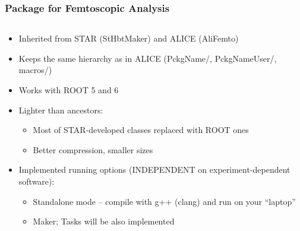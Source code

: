 \documentclass[dvipsnames] {beamer}
\begin{document}
      \begin{frame}
        \bf
        \frametitle{\bf \centering Package for Femtoscopic Analysis}
        \vskip -0.8cm
        \begin{columns}[t]
          \begin{block}{\bf {}}
            \begin{itemize}
            \item \scriptsize Inherited from STAR (StHbtMaker) and ALICE (AliFemto)
            \item \scriptsize Keeps the same hierarchy as in ALICE (PckgName/, PckgNameUser/, macros/)
            \item \scriptsize Works with ROOT 5 and 6
            \item  \scriptsize Lighter than ancestors:
              \begin{itemize}
              \item \scriptsize Most of STAR-developed classes replaced with ROOT ones
              \item \scriptsize Better compression, smaller sizes
              \end{itemize}
            \item \scriptsize Implemented running options (INDEPENDENT on experiment-dependent software):
              \begin{itemize}
              \item \scriptsize Standalone mode – compile with g++ (clang) and run on your “laptop”
              \item \scriptsize Maker; Tasks will be also implemented
              \end{itemize}
            \end{itemize}
          \end{block}


\end{columns}
\end{frame}
\end{document}

